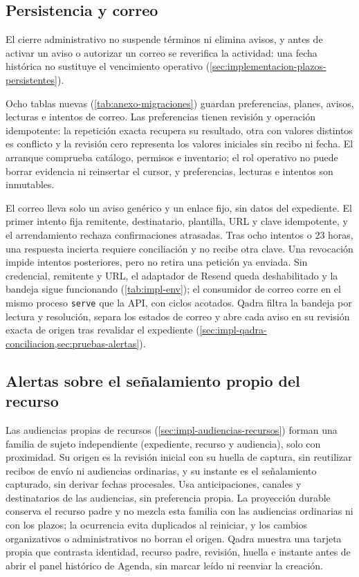 \subsection{Persistencia y correo}

El cierre administrativo no suspende términos ni elimina avisos, y antes de activar un aviso o autorizar un correo se reverifica la actividad: una fecha histórica no sustituye el vencimiento operativo (\cref{sec:implementacion-plazos-persistentes}).

Ocho tablas nuevas (\cref{tab:anexo-migraciones}) guardan preferencias, planes, avisos, lecturas e intentos de correo. Las preferencias tienen revisión y operación idempotente: la repetición exacta recupera su resultado, otra con valores distintos es conflicto y la revisión cero representa los valores iniciales sin recibo ni fecha. El arranque comprueba catálogo, permisos e inventario; el rol operativo no puede borrar evidencia ni reinsertar el cursor, y preferencias, lecturas e intentos son inmutables.

El correo lleva solo un aviso genérico y un enlace fijo, sin datos del expediente. El primer intento fija remitente, destinatario, plantilla, URL y clave idempotente, y el arrendamiento rechaza confirmaciones atrasadas. Tras ocho intentos o 23 horas, una respuesta incierta requiere conciliación y no recibe otra clave. Una revocación impide intentos posteriores, pero no retira una petición ya enviada. Sin credencial, remitente y URL, el adaptador de Resend queda deshabilitado y la bandeja sigue funcionando (\cref{tab:impl-env}); el consumidor de correo corre en el mismo proceso \texttt{serve} que la API, con ciclos acotados. Qadra filtra la bandeja por lectura y resolución, separa los estados de correo y abre cada aviso en su revisión exacta de origen tras revalidar el expediente (\cref{sec:impl-qadra-conciliacion,sec:pruebas-alertas}).

\subsection{Alertas sobre el señalamiento propio del recurso}\label{sec:impl-alertas-audiencias-recursos}

Las audiencias propias de recursos (\cref{sec:impl-audiencias-recursos}) forman una familia de sujeto independiente (expediente, recurso y audiencia), solo con proximidad. Su origen es la revisión inicial con su huella de captura, sin reutilizar recibos de envío ni audiencias ordinarias, y su instante es el señalamiento capturado, sin derivar fechas procesales. Usa anticipaciones, canales y destinatarios de las audiencias, sin preferencia propia. La proyección durable conserva el recurso padre y no mezcla esta familia con las audiencias ordinarias ni con los plazos; la ocurrencia evita duplicados al reiniciar, y los cambios organizativos o administrativos no borran el origen. Qadra muestra una tarjeta propia que contrasta identidad, recurso padre, revisión, huella e instante antes de abrir el panel histórico de Agenda, sin marcar leído ni reenviar la creación.


